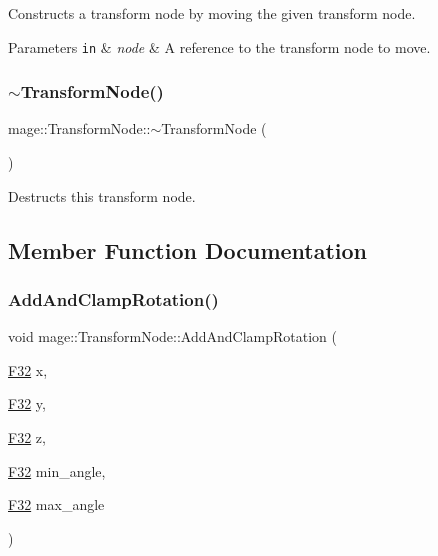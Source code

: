 Constructs a transform node by moving the given transform node.


\begin{DoxyParams}[1]{Parameters}
\mbox{\tt in}  & {\em node} & A reference to the transform node to move. \\
\hline
\end{DoxyParams}
\hypertarget{classmage_1_1_transform_node_a0c5e84d99c27cda31dae8106611d682f}{}\label{classmage_1_1_transform_node_a0c5e84d99c27cda31dae8106611d682f} 
\subsubsection{\texorpdfstring{$\sim$\+Transform\+Node()}{~TransformNode()}}
{\footnotesize\ttfamily mage\+::\+Transform\+Node\+::$\sim$\+Transform\+Node (\begin{DoxyParamCaption}{ }\end{DoxyParamCaption})\hspace{0.3cm}{\ttfamily [default]}}

Destructs this transform node. 

\subsection{Member Function Documentation}
\hypertarget{classmage_1_1_transform_node_ab12f50db5ea7b78b17c5fb580b6bbdcd}{}\label{classmage_1_1_transform_node_ab12f50db5ea7b78b17c5fb580b6bbdcd} 
\subsubsection{\texorpdfstring{Add\+And\+Clamp\+Rotation()}{AddAndClampRotation()}\hspace{0.1cm}{\footnotesize\ttfamily [1/3]}}
{\footnotesize\ttfamily void mage\+::\+Transform\+Node\+::\+Add\+And\+Clamp\+Rotation (\begin{DoxyParamCaption}\item[{\hyperlink{namespacemage_aa97e833b45f06d60a0a9c4fc22ae02c0}{F32}}]{x,  }\item[{\hyperlink{namespacemage_aa97e833b45f06d60a0a9c4fc22ae02c0}{F32}}]{y,  }\item[{\hyperlink{namespacemage_aa97e833b45f06d60a0a9c4fc22ae02c0}{F32}}]{z,  }\item[{\hyperlink{namespacemage_aa97e833b45f06d60a0a9c4fc22ae02c0}{F32}}]{min\+\_\+angle,  }\item[{\hyperlink{namespacemage_aa97e833b45f06d60a0a9c4fc22ae02c0}{F32}}]{max\+\_\+angle }\end{DoxyParamCaption})\hspace{0.3cm}{\ttfamily [noexcept]}}

